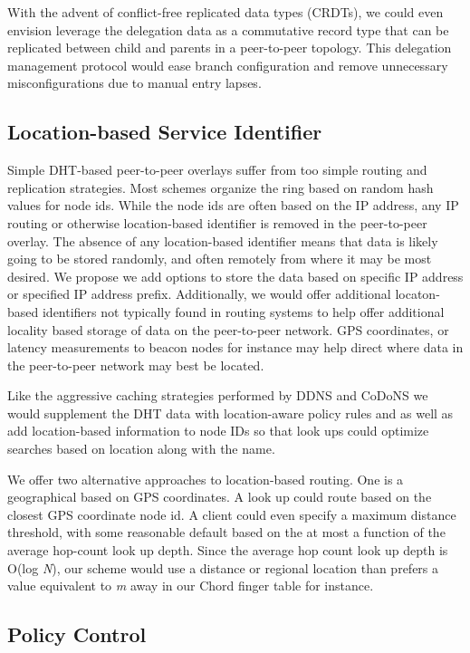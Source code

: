 \documentclass[sigconf]{acmart}
\begin{document}
With the advent of conflict-free replicated data types (CRDTs), we could
even envision leverage the delegation data as a commutative record type
that can be replicated between child and parents in a peer-to-peer
topology.\cite{shapiro_conflict-free_2011}  This delegation management
protocol would ease branch configuration and remove unnecessary
misconfigurations due to manual entry lapses.

\subsection{Location-based Service Identifier}

Simple DHT-based peer-to-peer overlays suffer from too simple routing
and replication strategies.  Most schemes organize the ring based on
random hash values for node ids.  While the node ids are often based on
the IP address, any IP routing or otherwise location-based identifier is
removed in the peer-to-peer overlay.  The absence of any location-based
identifier means that data is likely going to be stored randomly, and
often remotely from where it may be most desired.  We propose we add
options to store the data based on specific IP address or specified IP
address prefix.  Additionally, we would offer additional locaton-based
identifiers not typically found in routing systems to help offer
additional locality based storage of data on the peer-to-peer network.
GPS coordinates, or latency measurements to beacon nodes for instance
may help direct where data in the peer-to-peer network may best be
located.

Like the aggressive caching strategies performed by DDNS and CoDoNS we
would supplement the DHT data with location-aware policy rules and as
well as add location-based information to node IDs so that look ups
could optimize searches based on location along with the name.

We offer two alternative approaches to location-based routing.  One is a
geographical based on GPS coordinates.  A look up could route based on
the closest GPS coordinate node id.  A client could even specify a
maximum distance threshold, with some reasonable default based on the at
most a function of the average hop-count look up depth.  Since the
average hop count look up depth is O(log \emph{N}), our scheme would use
a distance or regional location than prefers a value equivalent to
\emph{m} away in our Chord finger table for instance.

\subsection{Policy Control}
\end{document}

